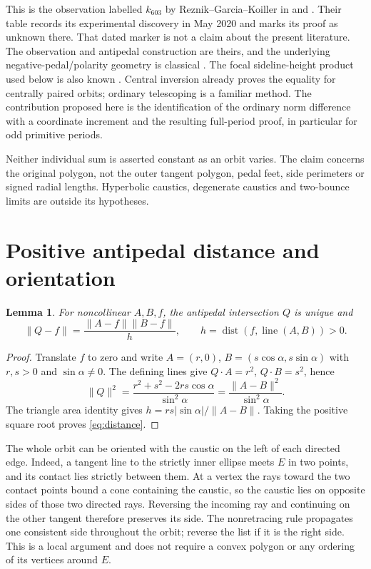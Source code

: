 \documentclass[10pt]{article}
\newtheorem{lemma}{Lemma}
\begin{document}
This is the observation labelled $k_{603}$ by Reznik--Garcia--Koiller
in \cite[\S\S3.5,3.7 and Table 7]{RGKpre} and
\cite[\S3.7 and Table 7, p.~349]{RGKjournal}. Their table records its
experimental discovery in May 2020 and marks its proof as unknown there.
That dated marker is not a claim about the present literature. The
observation and antipedal construction are theirs, and the underlying
negative-pedal/polarity geometry is classical \cite[Arts.~121--122]{Salmon}.
The focal sideline-height product used below is also known
\cite[Lemma 4.2]{BT}. Central inversion already proves the equality for
centrally paired orbits; ordinary telescoping is a familiar method.
The contribution proposed here is the identification of the ordinary
norm difference with a coordinate increment and the resulting full-period
proof, in particular for odd primitive periods.

Neither individual sum is asserted constant as an orbit varies. The
claim concerns the original polygon, not the outer tangent polygon,
pedal feet, side perimeters or signed radial lengths. Hyperbolic caustics,
degenerate caustics and two-bounce limits are outside its hypotheses.

\section{Positive antipedal distance and orientation}
\begin{lemma}\label{lem:distance}
For noncollinear $A,B,f$, the antipedal intersection $Q$ is unique and
\begin{equation}\label{eq:distance}
 \lVert Q-f\rVert=\frac{\lVert A-f\rVert\lVert B-f\rVert}{h},
 \qquad h=\operatorname{dist}(f,\operatorname{line}(A,B))>0.
\end{equation}
\end{lemma}
\begin{proof}
Translate $f$ to zero and write $A=(r,0)$,
$B=(s\cos\alpha,s\sin\alpha)$ with $r,s>0$ and
$\sin\alpha\ne0$. The defining lines give
$Q\cdot A=r^2$, $Q\cdot B=s^2$, hence
\[
 \lVert Q\rVert^2
 =\frac{r^2+s^2-2rs\cos\alpha}{\sin^2\alpha}
 =\frac{\lVert A-B\rVert^2}{\sin^2\alpha}.
\]
The triangle area identity gives
$h=rs|\sin\alpha|/\lVert A-B\rVert$. Taking the positive square root
proves \eqref{eq:distance}.
\end{proof}

The whole orbit can be oriented with the caustic on the left of each
directed edge. Indeed, a tangent line to the strictly inner ellipse meets
$E$ in two points, and its contact lies strictly between them. At a
vertex the rays toward the two contact points bound a cone containing
the caustic, so the caustic lies on opposite sides of those two directed
rays. Reversing the incoming ray and continuing on the other tangent
therefore preserves its side. The nonretracing rule propagates one
consistent side throughout the orbit; reverse the list if it is the
right side. This is a local argument and does not require a convex
polygon or any ordering of its vertices around $E$.
\end{document}
